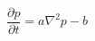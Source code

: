 \documentclass[preview]{standalone}
\begin{document}
\begin{equation*}
\frac{\partial p}{\partial t} = a\nabla^2p-b
\end{equation*}
\end{document}
